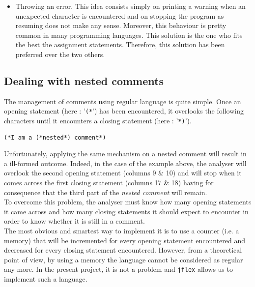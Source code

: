 \documentclass[a4paper,11pt]{article}
\begin{document}
\begin{itemize}
      \item Throwing an error. This idea consists simply on printing a warning when an unexpected character is encountered and on stopping the program as resuming does not make any sense. Moreover, this behaviour is pretty common in many programming languages. This solution is the one who fits the best the assignment statements. Therefore, this solution has been preferred over the two others.
    \end{itemize}

  \subsection{Dealing with nested comments}
    The management of comments using regular language is quite simple. Once an opening statement (here : '\verb|(*|') has been encountered, it overlooks the following characters until it encounters a closing statement (here : '\verb|*)|').
    \begin{lstlisting}
(*I am a (*nested*) comment*)\end{lstlisting}
    Unfortunately, applying the same mechanism on a nested comment will result in a ill-formed outcome. Indeed, in the case of the example above, the analyser will overlook the second opening statement (columns 9 \& 10) and will stop when it comes across the first closing statement (columns 17 \& 18) having for consequence that the third part of the \textit{nested comment} will remain.\\
    To overcome this problem, the analyser must know how many opening statements it came across and how many closing statements it should expect to encounter in order to know whether it is still in a comment.\\
    The most obvious and smartest way to implement it is to use a counter (i.e. a memory) that will be incremented for every opening statement encountered and decreased for every closing statement encountered. However, from a theoretical point of view, by using a memory the language cannot be considered as regular any more. In the present project, it is not a problem and \verb|jflex| allows us to implement such a language.
    
\end{document}
